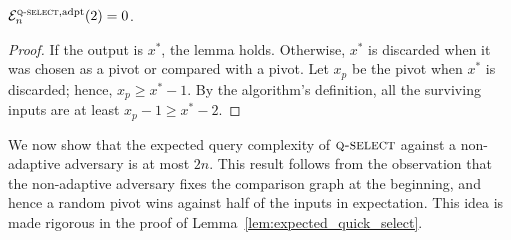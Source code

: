 \documentclass[twoside,11pt]{article}
\newcommand{\cE}{\mathcal{E}}
\newcommand{\algorithms}[1]{\textsc{#1}}
\newcommand{\algquickselect}{\algorithms{q-select}}
\newcommand{\maxx}{x^*}
\newcommand{\pe}{\cE}
\newcommand{\adaptive}{\textnormal{adpt}}
\begin{document}
\begin{lemma}
\label{lem:quick}
  $\pe_n^{\algquickselect,\adaptive}(2)=0$.
\end{lemma}
\begin{proof}
 If the output is $\maxx$, the lemma holds. Otherwise, $\maxx$
 is discarded when it was chosen as a pivot or 
 compared with a pivot. Let $x_p$ be the pivot when $\maxx$ 
 is discarded; hence, $x_p\ge \maxx-1$. 
 By the algorithm's definition, all the surviving inputs
 are at least $x_p-1\ge \maxx-2$.
\end{proof}

We now show that the expected query complexity of
  $\algquickselect$ against a non-adaptive adversary is at most
  $2n$. This result follows from the observation that the non-adaptive
  adversary fixes the comparison graph at the beginning, and
    hence a random pivot wins against half of the inputs in
  expectation. This idea is made rigorous in the proof of
  Lemma~\ref{lem:expected_quick_select}.
\end{document}
